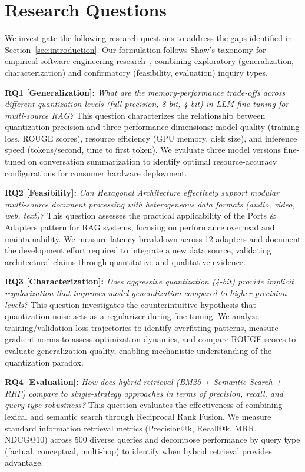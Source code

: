 \documentclass[pdflatex,sn-basic]{sn-jnl}
\begin{document}
\section{Research Questions}
\label{sec:research-questions}

We investigate the following research questions to address the gaps identified in Section~\ref{sec:introduction}. Our formulation follows Shaw's taxonomy for empirical software engineering research~\citep{shaw2003writing}, combining exploratory (generalization, characterization) and confirmatory (feasibility, evaluation) inquiry types.

\noindent
\textbf{RQ1 [Generalization]:} \textit{What are the memory-performance trade-offs across different quantization levels (full-precision, 8-bit, 4-bit) in LLM fine-tuning for multi-source RAG?} This question characterizes the relationship between quantization precision and three performance dimensions: model quality (training loss, ROUGE scores), resource efficiency (GPU memory, disk size), and inference speed (tokens/second, time to first token). We evaluate three model versions fine-tuned on conversation summarization to identify optimal resource-accuracy configurations for consumer hardware deployment.

\noindent
\textbf{RQ2 [Feasibility]:} \textit{Can Hexagonal Architecture effectively support modular multi-source document processing with heterogeneous data formats (audio, video, web, text)?} This question assesses the practical applicability of the Ports \& Adapters pattern for RAG systems, focusing on performance overhead and maintainability. We measure latency breakdown across 12 adapters and document the development effort required to integrate a new data source, validating architectural claims through quantitative and qualitative evidence.

\noindent
\textbf{RQ3 [Characterization]:} \textit{Does aggressive quantization (4-bit) provide implicit regularization that improves model generalization compared to higher precision levels?} This question investigates the counterintuitive hypothesis that quantization noise acts as a regularizer during fine-tuning. We analyze training/validation loss trajectories to identify overfitting patterns, measure gradient norms to assess optimization dynamics, and compare ROUGE scores to evaluate generalization quality, enabling mechanistic understanding of the quantization paradox.

\noindent
\textbf{RQ4 [Evaluation]:} \textit{How does hybrid retrieval (BM25 + Semantic Search + RRF) compare to single-strategy approaches in terms of precision, recall, and query type robustness?} This question evaluates the effectiveness of combining lexical and semantic search through Reciprocal Rank Fusion. We measure standard information retrieval metrics (Precision@k, Recall@k, MRR, NDCG@10) across 500 diverse queries and decompose performance by query type (factual, conceptual, multi-hop) to identify when hybrid retrieval provides advantage.
\end{document}
